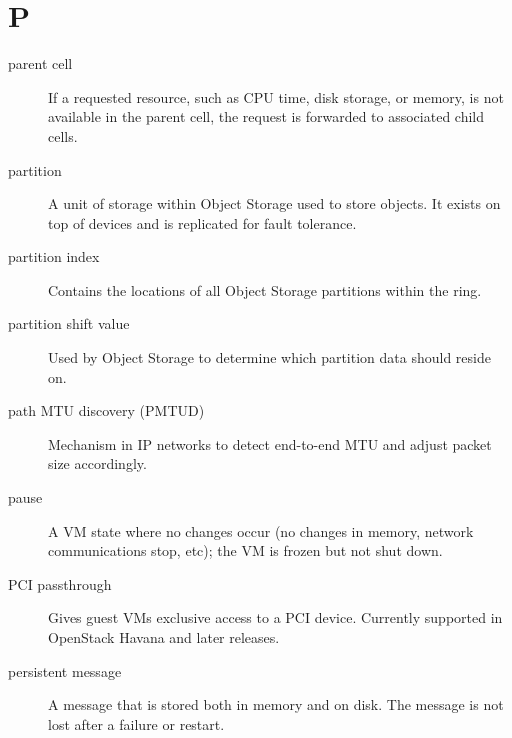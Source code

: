\documentclass[letterpaper,10pt,english]{sphinxmanual}
\begin{document}
\section{P}
\label{_source/glossary:p}\begin{description}
\item[{parent cell}] \leavevmode{}\label{_source/glossary:term-parent-cell}
If a requested resource, such as CPU time, disk storage, or
memory, is not available in the parent cell, the request is forwarded
to associated child cells.

\item[{partition}] \leavevmode{}\label{_source/glossary:term-partition}
A unit of storage within Object Storage used to store objects.
It exists on top of devices and is replicated for fault
tolerance.

\item[{partition index}] \leavevmode{}\label{_source/glossary:term-partition-index}
Contains the locations of all Object Storage partitions within
the ring.

\item[{partition shift value}] \leavevmode{}\label{_source/glossary:term-partition-shift-value}
Used by Object Storage to determine which partition data should
reside on.

\item[{path MTU discovery (PMTUD)}] \leavevmode{}\label{_source/glossary:term-path-mtu-discovery-pmtud}
Mechanism in IP networks to detect end-to-end MTU and adjust
packet size accordingly.

\item[{pause}] \leavevmode{}\label{_source/glossary:term-pause}
A VM state where no changes occur (no changes in memory, network
communications stop, etc); the VM is frozen but not shut down.

\item[{PCI passthrough}] \leavevmode{}\label{_source/glossary:term-pci-passthrough}
Gives guest VMs exclusive access to a PCI device. Currently
supported in OpenStack Havana and later releases.

\item[{persistent message}] \leavevmode{}\label{_source/glossary:term-persistent-message}
A message that is stored both in memory and on disk. The message
is not lost after a failure or restart.


\end{description}
\end{document}
